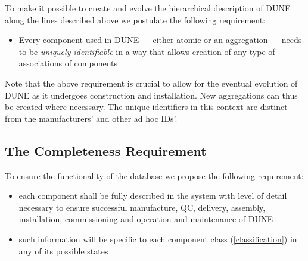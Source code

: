 \documentclass[pdftex,12pt,letter]{article}
\begin{document}
To make it possible to create and evolve the hierarchical description of DUNE along the lines described above
we postulate the following requirement:

\begin{itemize}

\item Every component used in DUNE ---  either atomic or an aggregation --- needs to be \textit{uniquely identifiable} in a way that allows
creation of any type of associations of components

\end{itemize}


\noindent Note that the above requirement is crucial to allow for the eventual evolution of DUNE as it undergoes construction and installation.
New aggregations can thus be created where necessary. The unique identifiers in this context are distinct from the manufacturers' and other ad hoc IDs'.





\subsection{The Completeness Requirement}

To ensure the functionality of the database we propose the following requirement:
\begin{itemize}
\item each component shall be fully described in the system with level of detail necessary to
ensure successful manufacture, QC, delivery, assembly, installation, commissioning
and operation and maintenance of DUNE

\item such information will be specific to each component class (\ref{classification}) in any of its possible states

\end{itemize}

\end{document}

